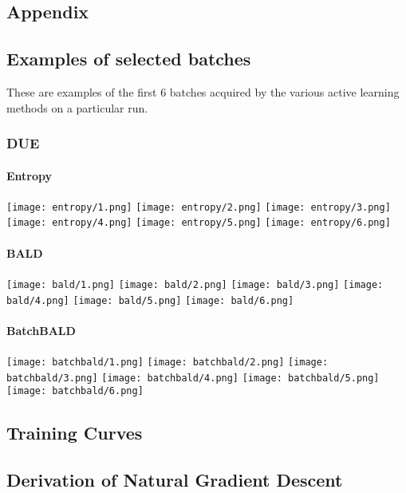 \documentclass[12pt, a4paper]{report}
\theoremstyle{definition}
\theoremstyle{definition}
\theoremstyle{definition}
\begin{document}
\begin{appendices}
\chapter{Appendix}

\section{Examples of selected batches}
\label{sec:Batches}

These are examples of the first 6 batches acquired by the various active learning methods on a particular run.

\subsection{DUE}

\subsubsection{Entropy}
\texttt{[image: entropy/1.png]}
\texttt{[image: entropy/2.png]}
\texttt{[image: entropy/3.png]}
\texttt{[image: entropy/4.png]}
\texttt{[image: entropy/5.png]}
\texttt{[image: entropy/6.png]}


\subsubsection{BALD}
\texttt{[image: bald/1.png]}
\texttt{[image: bald/2.png]}
\texttt{[image: bald/3.png]}
\texttt{[image: bald/4.png]}
\texttt{[image: bald/5.png]}
\texttt{[image: bald/6.png]}

\subsubsection{BatchBALD}
\texttt{[image: batchbald/1.png]}
\texttt{[image: batchbald/2.png]}
\texttt{[image: batchbald/3.png]}
\texttt{[image: batchbald/4.png]}
\texttt{[image: batchbald/5.png]}
\texttt{[image: batchbald/6.png]}

\section{Training Curves}

\section{Derivation of Natural Gradient Descent}

\end{appendices}
\end{document}
